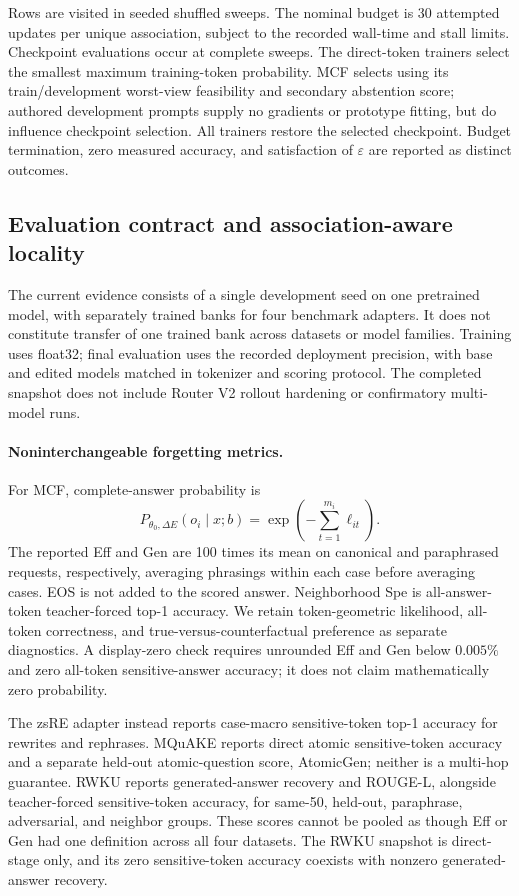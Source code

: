 \documentclass{article}
\newcommand{\bank}{\Delta E}
\newcommand{\eps}{\varepsilon}
\begin{document}
Rows are visited in seeded shuffled sweeps. The nominal budget is 30 attempted
updates per unique association, subject to the recorded wall-time and stall
limits. Checkpoint evaluations occur at complete sweeps. The direct-token
trainers select the smallest maximum training-token probability. MCF selects
using its train/development worst-view feasibility and secondary abstention
score; authored development prompts supply no gradients or prototype fitting,
but do influence checkpoint selection. All trainers restore the selected
checkpoint. Budget termination, zero measured accuracy, and satisfaction of
$\eps$ are reported as distinct outcomes.

\subsection{Evaluation contract and association-aware locality}
\label{sec:evaluation}

The current evidence consists of a single development seed on one pretrained
model, with separately trained banks for four benchmark adapters. It does not
constitute transfer of one trained bank across datasets or model families.
Training uses float32; final evaluation uses the recorded deployment precision,
with base and edited models matched in tokenizer and scoring protocol. The
completed snapshot does not include Router V2 rollout hardening or confirmatory
multi-model runs.

\paragraph{Noninterchangeable forgetting metrics.}
For MCF, complete-answer probability is
\begin{equation}
 P_{\theta_0,\bank}(o_i\mid x;b)
 =\exp\!\left(-\sum_{t=1}^{m_i}\ell_{it}\right).
 \label{eq:sequenceprob}
\end{equation}
The reported Eff and Gen are 100 times its mean on canonical and paraphrased
requests, respectively, averaging phrasings within each case before averaging
cases. EOS is not added to the scored answer. Neighborhood Spe is all-answer-token
teacher-forced top-1 accuracy. We retain token-geometric likelihood,
all-token correctness, and true-versus-counterfactual preference as separate
diagnostics. A display-zero check requires unrounded Eff and Gen below
$0.005\%$ and zero all-token sensitive-answer accuracy; it does not claim
mathematically zero probability.

The zsRE adapter instead reports case-macro sensitive-token top-1 accuracy
for rewrites and rephrases. MQuAKE reports direct atomic sensitive-token
accuracy and a separate held-out atomic-question score, AtomicGen; neither is
a multi-hop guarantee. RWKU reports generated-answer recovery and ROUGE-L,
alongside teacher-forced sensitive-token accuracy, for same-50, held-out,
paraphrase, adversarial, and neighbor groups. These scores cannot be pooled as
though Eff or Gen had one definition across all four datasets. The RWKU
snapshot is direct-stage only, and its zero sensitive-token accuracy coexists
with nonzero generated-answer recovery.
\end{document}

